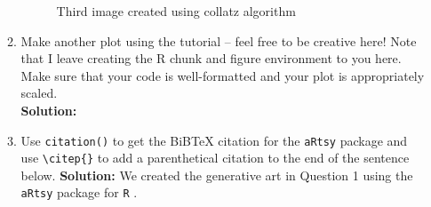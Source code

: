 \documentclass{article}\usepackage[]{graphicx}\usepackage[]{xcolor}
\makeatletter
\newenvironment{kframe}{%
 \def\at@end@of@kframe{}%
 \ifinner\ifhmode%
  \def\at@end@of@kframe{\end{minipage}}%
  \begin{minipage}{\columnwidth}%
 \fi\fi%
 \def\FrameCommand##1{\hskip\@totalleftmargin \hskip-\fboxsep
 \colorbox{shadecolor}{##1}\hskip-\fboxsep
     \hskip-\linewidth \hskip-\@totalleftmargin \hskip\columnwidth}%
 \MakeFramed {\advance\hsize-\width
   \@totalleftmargin\z@ \linewidth\hsize
   \@setminipage}}%
 {\par\unskip\endMakeFramed%
 \at@end@of@kframe}
\newenvironment{knitrout}{}{} %
\makeatother
\begin{document}
\begin{enumerate}
\begin{enumerate}
\begin{figure}[H]
\begin{center}
\begin{knitrout}
\begin{kframe}
{\ttfamily\noindent\bfseries\color{errorcolor}{\#\# Error in x[sample.int(length(x), size, replace, prob)]: object of type 'closure' is not subsettable}}\end{kframe}
\end{knitrout}
\caption{Third image created using collatz algorithm}
\label{CollatzPlot3}
\end{center}
\end{figure}
  \item Make another plot using the tutorial -- feel free to be creative here! 
  Note that I leave creating the R chunk and figure environment to you here. 
  Make sure that your code is well-formatted and your plot is appropriately scaled.\\
  \textbf{Solution:}
  \item Use \texttt{citation()} to get the BiBTeX citation for the \texttt{aRtsy}
  package and use \verb|\citep{}| to add a parenthetical citation to the end of
  the sentence below.
\textbf{Solution:} We created the generative art in Question 1 using the \texttt{aRtsy}
package for \texttt{R} \citep{artsy}.
\end{enumerate}

\newpage


\end{enumerate}
\end{document}
